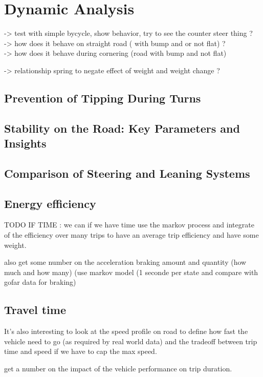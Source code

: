 \section{Dynamic Analysis}

-> test with simple bycycle, show behavior, try to see the counter steer thing ?\\

-> how does it behave on straight road ( with bump and or not flat) ?\\

-> how does it behave during cornering (road with bump and not flat)

-> relationship spring to negate effect of weight and weight change ?\\

\subsection{Prevention of Tipping During Turns}

\subsection{Stability on the Road: Key Parameters and Insights}

\subsection{Comparison of Steering and Leaning Systems}

\subsection{Energy efficiency}
TODO IF TIME : 
we can if we have time use the markov process and integrate of the efficiency over many trips to have an average trip efficiency and have some weight.

also get some number on the acceleration braking amount and quantity (how much and how many) (use markov model (1 seconde per state and compare with gofar data for braking)

\subsection{Travel time}
It's also interesting to look at the speed profile on road to define how fast the vehicle need to go (as required by real world data) and the tradeoff between trip time and speed if we have to cap the max speed.

get a number on the impact of the vehicle performance on trip duration.
